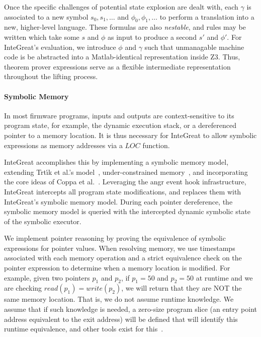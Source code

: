 Once the specific challenges of potential state explosion are dealt with, each $\gamma$ is associated to a new symbol $s_{0}, s_{1}, \dots$ and $\phi_{0}, \phi_{1}, \dots$ to perform a translation into a new, higher-level language.
These formulas are also \emph{nestable}, and rules may be written which take some $s$ and $\phi$ as input to produce a second $s'$ and $\phi'$.
For InteGreat's evaluation, we introduce $\phi$ and $\gamma$ such that unmanagable machine code is be abstracted into a Matlab-identical representation inside Z3.
Thus, theorem prover expressions serve as a flexible intermediate representation throughout the lifting process.

\paragraph{Symbolic Memory}
\label{sec:symb-mem-expl}
In most firmware programs, inputs and outputs are context-sensitive to its program state, for example, the dynamic execution stack, or a dereferenced pointer to a memory location.
It is thus necessary for InteGreat to allow symbolic expressions as memory addresses via a $LOC$ function.

InteGreat accomplishes this by implementing a symbolic memory model, extending Trt{\'\i}k et al.'s model~\cite{symbolic-memory}, under-constrained memory~\cite{Under-Constrained}, and incorporating the core ideas of Coppa et al.~\cite{coppa2017rethinking}.
Leveraging the angr event hook infrastructure, InteGreat intercepts all program state modifications, and replaces them with InteGreat's symbolic memory model. 
During each pointer dereference, the symbolic memory model is queried with the intercepted dynamic symbolic state of the symbolic executor.

We implement pointer reasoning by proving the equivalence of symbolic expressions for pointer values.
When resolving memory, we use timestamps associated with each memory operation and a strict equivalence check on the pointer expression to determine when a memory location is modified.
For example, given two pointers $p_{1}$ and $p_{2}$, if $p_{1} = 50$ and $p_{2} = 50$ at runtime and we are checking $read(p_{1}) = write(p_{2})$, we will return that they are NOT the same memory location. 
That is, we do not assume runtime knowledge. 
We assume that if such knowledge is needed, a zero-size program slice (an entry point address equivalent to the exit address) will be defined that will identify this runtime equivalence, and other tools exist for this~\cite{hind2001pointer}.

